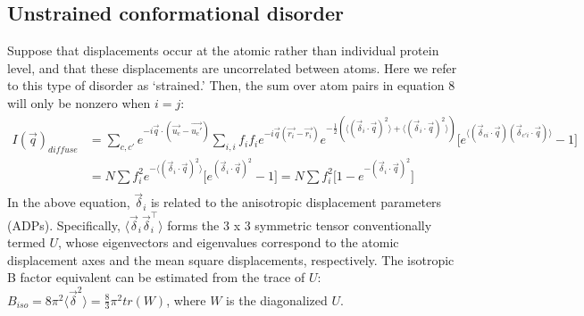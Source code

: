 \documentclass{article}
\begin{document}
\subsection{Unstrained conformational disorder} Suppose that displacements occur at the atomic rather than individual protein level, and that these displacements are uncorrelated between atoms. Here we refer to this type of disorder as `strained.' Then, the sum over atom pairs in equation 8 will only be nonzero when $i = j$:
\begin{equation}
\begin{aligned}
I(\vec{q})_{diffuse} & = \sum\limits_{c,c'} e^{-i \vec{q} \cdot (\vec{u_c} - \vec{u_c'})} \sum\limits_{i,i} f_i f_i e^{-i \vec{q} (\vec{r_i} - \vec{r_i})} e^{-\frac{1}{2} (\langle (\vec{\delta}_i \cdot \vec{q})^2 \rangle + \langle (\vec{\delta}_i \cdot \vec{q})^2 \rangle) } \lbrack e^{\langle ( \vec{\delta}_{ci} \cdot \vec{q} ) ( \vec{\delta}_{c'i} \cdot \vec{q} ) \rangle} - 1 \rbrack \\
& = N \sum f_i^2 e^{-\langle (\vec{\delta}_i \cdot \vec{q})^2 \rangle } \lbrack e^{ ( \vec{\delta}_{i} \cdot \vec{q} )^2 } - 1 \rbrack = N \sum f_i^2 \lbrack 1 - e^{- (\vec{\delta}_i \cdot \vec{q})^2 } \rbrack \\
\end{aligned}
\end{equation}
In the above equation, $\vec{\delta}_i$ is related to the anisotropic displacement parameters (ADPs). Specifically, $ \langle \vec{\delta}_i \vec{\delta}_i^\intercal \rangle $ forms the 3 x 3 symmetric tensor conventionally termed $U$, whose eigenvectors and eigenvalues correspond to the atomic displacement axes and the mean square displacements, respectively\footnotemark. The isotropic B factor equivalent can be estimated from the trace of $U$: $B_{iso} = 8\pi^2 \langle \vec{\delta}^2 \rangle = \frac{8}{3} \pi^2 tr(W) $, where $W$ is the diagonalized $U$.

\end{document}
